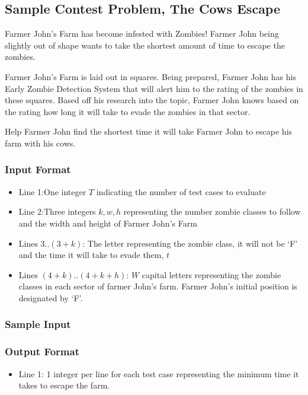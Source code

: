\subsection{Sample Contest Problem, The Cows Escape}
Farmer John's Farm has become infested with Zombies!
Farmer John being slightly out of shape wants to take the shortest amount of time to escape the zombies.

Farmer John's Farm is laid out in squares.
Being prepared, Farmer John has his Early Zombie Detection System that will alert him to the rating of the zombies in these squares.
Based off his research into the topic, Farmer John knows based on the rating how long it will take to evade the zombies in that sector.

Help Farmer John find the shortest time it will take Farmer John to escape his farm with his cows.

\subsubsection{Input Format}
\begin{itemize}
	\item Line 1:One integer $T$ indicating the number of test cases to evaluate
	\item Line 2:Three integers $k,w,h$ representing the number zombie classes to follow and the width and height of Farmer John's Farm
	\item Lines 3..$(3+k)$: The letter representing the zombie class, it will not be `F' and the time it will take to evade them, $t$
	\item Lines $(4+k)$..$(4+k+h)$: $W$ capital letters representing the zombie classes in each sector of farmer John's farm.  Farmer John's initial position is designated by `F'.
\end{itemize}

\subsubsection{Sample Input}

\subsubsection{Output Format}
\begin{itemize}
	\item Line 1:  1 integer per line for each test case representing the minimum time it takes to escape the farm.
\end{itemize}

